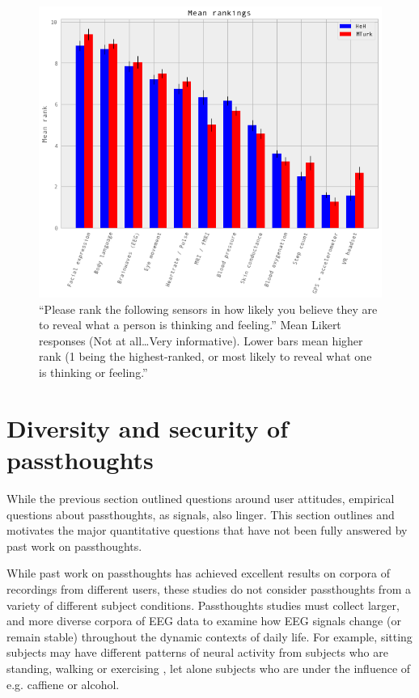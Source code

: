 \documentclass[sigconf]{acmart}
\begin{document}
\label{fig:rank}
\begin{figure}
\centering
\includegraphics[width=.9\linewidth]{./figures/rankings.png}
\caption{``Please rank the following sensors in how likely you believe they are to reveal what a person is thinking and feeling.'' Mean Likert responses (Not at all\ldots{}Very informative). Lower bars mean higher rank (1 being the highest-ranked,  or most likely to reveal what one is thinking or feeling.''}
\end{figure}



\section{Diversity and security of passthoughts}
\label{sec:org442b6ed}

While the previous section outlined questions around user attitudes, empirical questions about passthoughts, as signals, also linger.
This section outlines and motivates the major quantitative questions that have not been fully answered by past work on passthoughts.

While past work on passthoughts has achieved excellent results on corpora of recordings from different users, 
these studies do not consider passthoughts from a variety of different subject conditions.
Passthoughts studies must collect larger, and more diverse corpora of EEG data to examine how EEG signals change (or remain stable) throughout the dynamic contexts of daily life.
For example, sitting subjects may have different patterns of neural activity from subjects who are standing, walking or exercising \cite{Thibault2016a},
let alone subjects who are under the influence of e.g. caffiene or alcohol.
\end{document}
